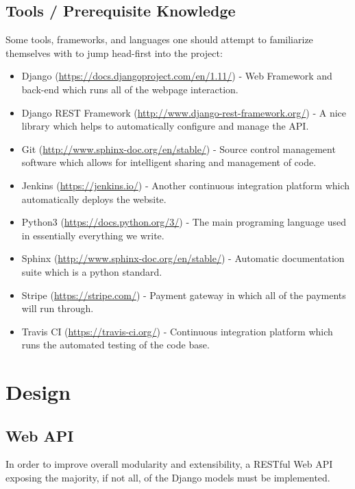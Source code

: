 \documentclass{article}
\begin{document}
\subsection{Tools / Prerequisite Knowledge}
Some tools, frameworks, and languages one should attempt to familiarize 
themselves with to jump head-first into the project:
\begin{itemize}
    \item Django (\url{https://docs.djangoproject.com/en/1.11/}) - Web 
          Framework and back-end which runs all of the webpage interaction.
    \item Django REST Framework (\url{http://www.django-rest-framework.org/}) -
          A nice library which helps to automatically configure and manage the
          API.
    \item Git (\url{http://www.sphinx-doc.org/en/stable/}) - Source control
          management software which allows for intelligent sharing and
          management of code.
    \item Jenkins (\url{https://jenkins.io/}) - Another continuous
          integration platform which automatically deploys the website.
    \item Python3 (\url{https://docs.python.org/3/}) - The main programing
          language used in essentially everything we write.
    \item Sphinx (\url{http://www.sphinx-doc.org/en/stable/}) - Automatic
          documentation suite which is a python standard.
    \item Stripe (\url{https://stripe.com/}) - Payment gateway in which all of
          the payments will run through.
    \item Travis CI (\url{https://travis-ci.org/}) - Continuous integration
          platform which runs the automated testing of the code base.
\end{itemize}

\section{Design}
\subsection{Web API}
In order to improve overall modularity and extensibility, a RESTful Web API
exposing the majority, if not all, of the Django models must be implemented. 
\end{document}
